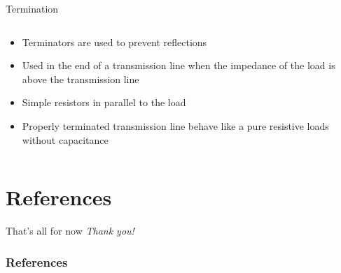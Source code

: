 \documentclass{beamer}
\begin{document}
\begin{frame}{Termination}
\begin{columns}
  \begin{column}{0.48\textwidth}
   \begin{itemize}
    \item Terminators are used to prevent reflections
    \item Used in the end of a transmission line when the impedance of
          the load is above the transmission line
    \item Simple resistors in parallel to the load
    \item Properly terminated transmission line behave like a pure resistive loads without capacitance
   \end{itemize}
  \end{column}
  \begin{column}{0.48\textwidth}
  \end{column}
\end{columns}
\end{frame}

\logo{} %
\section{References}

\begin{frame}{That's all for now}
\centering \Huge
\emph{Thank you!}
\end{frame}

\begin{frame}[t, allowframebreaks]
\frametitle{References}


\end{frame}
\end{document}
